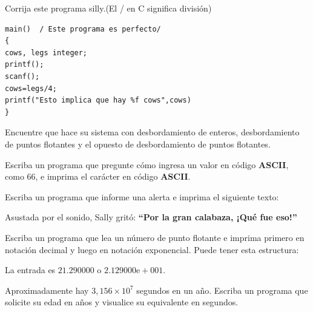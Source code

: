 \documentclass[spanish,addpoints,answers,a4paper]{exam}
\begin{document}
\begin{questions}
\begin{solution}
	
\end{solution}

\question Corrija este programa silly.\qquad(El / en C significa división)

\begin{verbatim}
main()	/ Este programa es perfecto/
{
cows, legs integer;
printf();
scanf();
cows=legs/4;
printf("Esto implica que hay %f cows",cows)
}
\end{verbatim}

\begin{solution}
	
\end{solution}

\question Encuentre que hace su sistema con desbordamiento de enteros, desbordamiento de puntos flotantes y el opuesto de desbordamiento de puntos flotantes.

\begin{solution}
	
\end{solution}

\question Escriba un programa que pregunte cómo ingresa un valor en código \textbf{ASCII}, como $66$, e imprima el carácter en código \textbf{ASCII}.

\begin{solution}
	
\end{solution}

\question Escriba un programa que informe una alerta e imprima el siguiente texto:

Asustada por el sonido, Sally gritó: \textbf{``Por la gran calabaza, ¡Qué fue eso!''}

\begin{solution}
	
\end{solution}

\question Escriba un programa que lea un número de punto flotante e imprima primero en notación decimal y luego en notación exponencial. Puede tener esta estructura:

La entrada es $21.290000$ o $2.129000\text{e}+001$.

\begin{solution}
	
\end{solution}

\question Aproximadamente hay $3,156\times10^{7}$ segundos en un año. Escriba un programa que solicite su edad en años y visualice su equivalente en segundos.


\end{questions}
\end{document}

